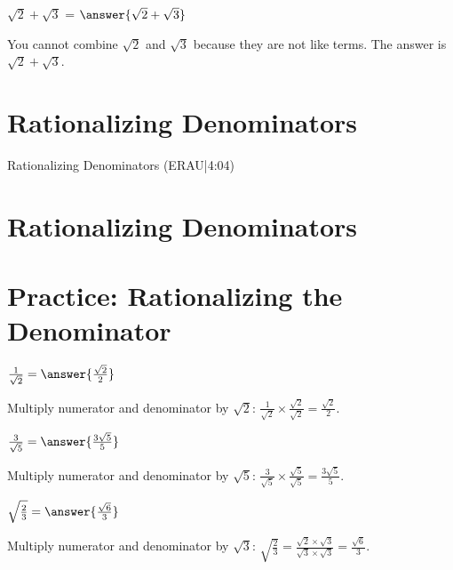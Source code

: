 \documentclass{ximera}
\begin{document}
\begin{problem}
$\sqrt{2} + \sqrt{3}$ = $\answer{\sqrt{2} + \sqrt{3}}$

\begin{feedback}
You cannot combine $\sqrt{2}$ and $\sqrt{3}$ because they are not like terms. The answer is $\sqrt{2} + \sqrt{3}$.
\end{feedback}
\end{problem}

\section*{Rationalizing Denominators}

Rationalizing Denominators (ERAU|4:04)


\section*{Rationalizing Denominators}

\section*{Practice: Rationalizing the Denominator}

\begin{problem}
$\frac{1}{\sqrt{2}} = \answer{\frac{\sqrt{2}}{2}}$

\begin{feedback}
Multiply numerator and denominator by $\sqrt{2}$: $\frac{1}{\sqrt{2}} \times \frac{\sqrt{2}}{\sqrt{2}} = \frac{\sqrt{2}}{2}$.
\end{feedback}
\end{problem}

\begin{problem}
$\frac{3}{\sqrt{5}} = \answer{\frac{3\sqrt{5}}{5}}$

\begin{feedback}
Multiply numerator and denominator by $\sqrt{5}$: $\frac{3}{\sqrt{5}} \times \frac{\sqrt{5}}{\sqrt{5}} = \frac{3\sqrt{5}}{5}$.
\end{feedback}
\end{problem}

\begin{problem}
${\sqrt{\frac{2}{3}}} = \answer{\frac{\sqrt{6}}{3}}$

\begin{feedback}
Multiply numerator and denominator by $\sqrt{3}$: $\sqrt{\frac{2}{3}} = \frac{\sqrt{2} \times \sqrt{3}}{\sqrt{3} \times \sqrt{3}} = \frac{\sqrt{6}}{3}$.
\end{feedback}
\end{problem}
\end{document}
